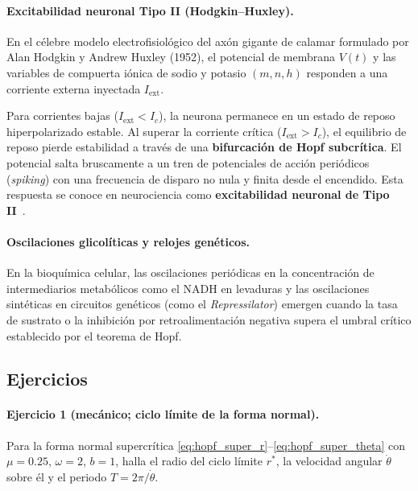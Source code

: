 \paragraph{Excitabilidad neuronal Tipo II (Hodgkin--Huxley).}
En el célebre modelo electrofisiológico del axón gigante de calamar formulado por Alan Hodgkin y Andrew Huxley (1952), el potencial de membrana $V(t)$ y las variables de compuerta iónica de sodio y potasio $(m, n, h)$ responden a una corriente externa inyectada $I_{\text{ext}}$.

Para corrientes bajas ($I_{\text{ext}} < I_c$), la neurona permanece en un estado de reposo hiperpolarizado estable. Al superar la corriente crítica ($I_{\text{ext}} > I_c$), el equilibrio de reposo pierde estabilidad a través de una \textbf{bifurcación de Hopf subcrítica}. El potencial salta bruscamente a un tren de potenciales de acción periódicos (\emph{spiking}) con una frecuencia de disparo no nula y finita desde el encendido. Esta respuesta se conoce en neurociencia como \textbf{excitabilidad neuronal de Tipo II}~\cite{edelstein2007}.

\paragraph{Oscilaciones glicolíticas y relojes genéticos.}
En la bioquímica celular, las oscilaciones periódicas en la concentración de intermediarios metabólicos como el NADH en levaduras y las oscilaciones sintéticas en circuitos genéticos (como el \emph{Repressilator}) emergen cuando la tasa de sustrato o la inhibición por retroalimentación negativa supera el umbral crítico establecido por el teorema de Hopf.

\subsection{Ejercicios}

\paragraph{Ejercicio 1 (mecánico; ciclo límite de la forma normal).} Para la forma normal supercrítica \eqref{eq:hopf_super_r}--\eqref{eq:hopf_super_theta} con $\mu=0.25$, $\omega=2$, $b=1$, halla el radio del ciclo límite $r^*$, la velocidad angular $\dot\theta$ sobre él y el periodo $T=2\pi/\dot\theta$.

